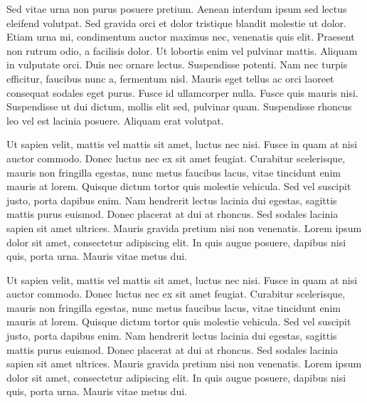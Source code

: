 \documentclass{article}
\newcommand{\voiceshrink}{-5mm}
\newenvironment{MC}
               {\begin{tcolorbox}[enhanced,
                     breakable,
                     parbox=false,
                     colback=voice-bg,
                     colframe=voice-frame,
                     grow to left by=\voiceshrink,
                     attach boxed title to top right={xshift=-5mm,
                       yshift=-3mm,
                       yshifttext=-1mm},
                     coltitle=black,
                     colbacktitle=voice-title-bg,
                     title=MC,
                     boxed title style={size=small,
                       colframe=black}]}
               {\end{tcolorbox}}
\begin{document}
\begin{MC}

Sed vitae urna non purus posuere pretium. Aenean interdum ipsum sed lectus eleifend volutpat. Sed gravida orci et dolor tristique blandit molestie ut dolor. Etiam urna mi, condimentum auctor maximus nec, venenatis quis elit. Praesent non rutrum odio, a facilisis dolor. Ut lobortis enim vel pulvinar mattis. Aliquam in vulputate orci. Duis nec ornare lectus. Suspendisse potenti. Nam nec turpis efficitur, faucibus nunc a, fermentum nisl. Mauris eget tellus ac orci laoreet consequat sodales eget purus. Fusce id ullamcorper nulla. Fusce quis mauris nisi. Suspendisse ut dui dictum, mollis elit sed, pulvinar quam. Suspendisse rhoncus leo vel est lacinia posuere. Aliquam erat volutpat.

Ut sapien velit, mattis vel mattis sit amet, luctus nec nisi. Fusce in quam at nisi auctor commodo. Donec luctus nec ex sit amet feugiat. Curabitur scelerisque, mauris non fringilla egestas, nunc metus faucibus lacus, vitae tincidunt enim mauris at lorem. Quisque dictum tortor quis molestie vehicula. Sed vel suscipit justo, porta dapibus enim. Nam hendrerit lectus lacinia dui egestas, sagittis mattis purus euismod. Donec placerat at dui at rhoncus. Sed sodales lacinia sapien sit amet ultrices. Mauris gravida pretium nisi non venenatis. Lorem ipsum dolor sit amet, consectetur adipiscing elit. In quis augue posuere, dapibus nisi quis, porta urna. Mauris vitae metus dui.

Ut sapien velit, mattis vel mattis sit amet, luctus nec nisi. Fusce in quam at nisi auctor commodo. Donec luctus nec ex sit amet feugiat. Curabitur scelerisque, mauris non fringilla egestas, nunc metus faucibus lacus, vitae tincidunt enim mauris at lorem. Quisque dictum tortor quis molestie vehicula. Sed vel suscipit justo, porta dapibus enim. Nam hendrerit lectus lacinia dui egestas, sagittis mattis purus euismod. Donec placerat at dui at rhoncus. Sed sodales lacinia sapien sit amet ultrices. Mauris gravida pretium nisi non venenatis. Lorem ipsum dolor sit amet, consectetur adipiscing elit. In quis augue posuere, dapibus nisi quis, porta urna. Mauris vitae metus dui.

\end{MC}
\end{document}
